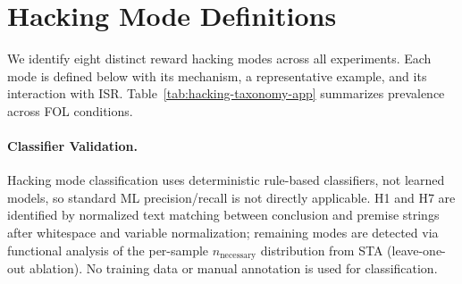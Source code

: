 \section{Hacking Mode Definitions}
\label{app:hacking-modes}

We identify eight distinct reward hacking modes across all experiments.
Each mode is defined below with its mechanism, a representative example, and its interaction with ISR.
Table~\ref{tab:hacking-taxonomy-app} summarizes prevalence across FOL conditions.

\begin{table}[h]
\centering
\small
{}
\caption{Hacking taxonomy across FOL conditions (\% of proved samples). ISR/Rand columns: $\beta{=}0.1$ 3-seed pooled. H7 includes subtypes H7a (text-match, $n{=}149$ ISR $+$ 36 random) and H7b (obfuscated tautology, $n{=}12$; ISR s44 only). $^\dagger$Random H7 driven by seed~43 (38.3\%); seeds~42/44: 0\%. Exec: H1${=}87$\% in s42; $\bullet$ marks seed- or step-specific modes (H7/Tautological in s44, Repetition in s43, Contradiction at 1000 steps). H8: premise-subset gaming (Appendix~\ref{app:h8}). C-w/o-util.: complexity-without-utility (random-specific). Q-as-fact: Prolog STA only (Table~\ref{tab:prolog-detailed}).}
\label{tab:hacking-taxonomy-app}
\end{table}

\paragraph{Classifier Validation.}
Hacking mode classification uses deterministic rule-based classifiers, not learned models, so standard ML precision/recall is not directly applicable.
H1 and H7 are identified by normalized text matching between conclusion and premise strings after whitespace and variable normalization; remaining modes are detected via functional analysis of the per-sample $n_{\text{necessary}}$ distribution from STA (leave-one-out ablation).
No training data or manual annotation is used for classification.

